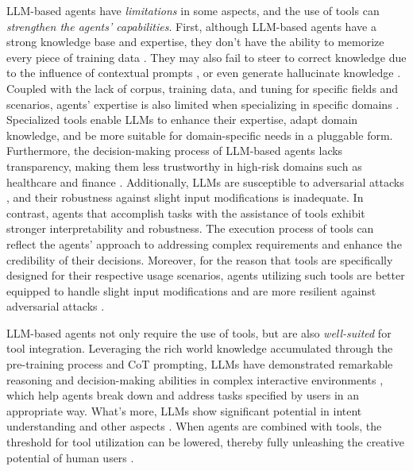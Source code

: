 LLM-based agents have \textit{limitations} in some aspects, and the use of tools can \textit{strengthen the agents' capabilities}. 
First, although LLM-based agents have a strong knowledge base and expertise, they don't have the ability to memorize every piece of training data \cite{DBLP:journals/corr/abs-2301-13188,DBLP:conf/icail/SavelkaAGWX23}. They may also fail to steer to correct knowledge due to the influence of contextual prompts \cite{DBLP:journals/corr/abs-2302-07842}, or even generate hallucinate knowledge \cite{DBLP:conf/eacl/RollerDGJWLXOSB21}. Coupled with the lack of corpus, training data, and tuning for specific fields and scenarios, agents' expertise is also limited when specializing in specific domains \cite{ling2023domain}. Specialized tools enable LLMs to enhance their expertise, adapt domain knowledge, and be more suitable for domain-specific needs in a pluggable form. 
Furthermore, the decision-making process of LLM-based agents lacks transparency, making them less trustworthy in high-risk domains such as healthcare and finance \cite{DBLP:journals/entropy/LinardatosPK21}. Additionally, LLMs are susceptible to adversarial attacks \cite{DBLP:journals/corr/abs-2307-15043}, and their robustness against slight input modifications is inadequate. In contrast, agents that accomplish tasks with the assistance of tools exhibit stronger interpretability and robustness. The execution process of tools can reflect the agents' approach to addressing complex requirements and enhance the credibility of their decisions. Moreover, for the reason that tools are specifically designed for their respective usage scenarios, agents utilizing such tools are better equipped to handle slight input modifications and are more resilient against adversarial attacks \cite{DBLP:journals/corr/abs-2304-08354}.

LLM-based agents not only require the use of tools, but are also \textit{well-suited} for tool integration. Leveraging the rich world knowledge accumulated through the pre-training process and CoT prompting, LLMs have demonstrated remarkable reasoning and decision-making abilities in complex interactive environments \cite{DBLP:conf/iclr/0002WSLCNCZ23}, which help agents break down and address tasks specified by users in an appropriate way. What's more, LLMs show significant potential in intent understanding and other aspects \cite{ DBLP:journals/corr/abs-2303-08774,DBLP:journals/corr/abs-2302-13971, DBLP:journals/corr/abs-2211-05100, almazrouei2023falcon}. When agents are combined with tools, the threshold for tool utilization can be lowered, thereby fully unleashing the creative potential of human users \cite{DBLP:journals/corr/abs-2304-08354}.

